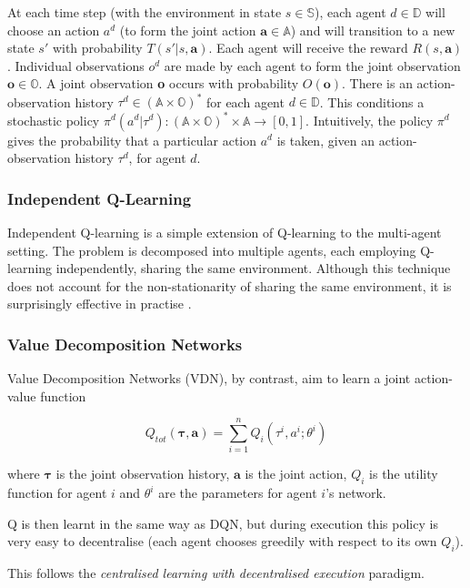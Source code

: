 At each time step (with the environment in state $s \in \mathbb{S}$), each agent $d \in \mathbb{D}$ will choose an action $a^d$ (to form the joint action $\textbf{a} \in \mathbb{A}$) and will transition to a new state $s'$ with probability $T(s'|s,\textbf{a})$. Each agent will receive the reward $R(s, \textbf{a})$. Individual observations $o^d$ are made by each agent to form the joint observation $\textbf{o} \in \mathbb{O}$. A joint observation \textbf{o} occurs with probability $O(\textbf{o})$. There is an action-observation history $\tau^d \in (\mathbb{A} \times \mathbb{O})^*$ for each agent $d \in \mathbb{D}$. This conditions a stochastic policy $\pi^d(a^d|\tau^d) : (\mathbb{A} \times \mathbb{O})^* \times \mathbb{A} \to [0, 1]$. Intuitively, the policy $\pi^d$ gives the probability that a particular action $a^d$ is taken, given an action-observation history $\tau^d$, for agent $d$.

\subsubsection{Independent Q-Learning}
Independent Q-learning \cite{IQL} is a simple extension of Q-learning to the multi-agent setting. The problem is decomposed into multiple agents, each employing Q-learning independently, sharing the same environment. Although this technique does not account for the non-stationarity of sharing the same environment, it is surprisingly effective in practise \cite{iqlisgood}. 


\subsubsection{Value Decomposition Networks}
Value Decomposition Networks \cite{vdn} (VDN), by contrast, aim to learn a joint action-value function

\[Q_{tot}(\boldsymbol{\tau}, \textbf{a}) = \sum_{i=1}^{n} Q_i(\tau^i,a^i;\theta^i) \]

where $\boldsymbol{\tau}$ is the joint observation history, $\textbf{a}$ is the joint action, $Q_i$ is the utility function for agent $i$ and $\theta^i$ are the parameters for agent $i$'s network.

Q is then learnt in the same way as DQN, but during execution this policy is very easy to decentralise (each agent chooses greedily with respect to its own $Q_i$).

This follows the \textit{centralised learning with decentralised execution} paradigm.

